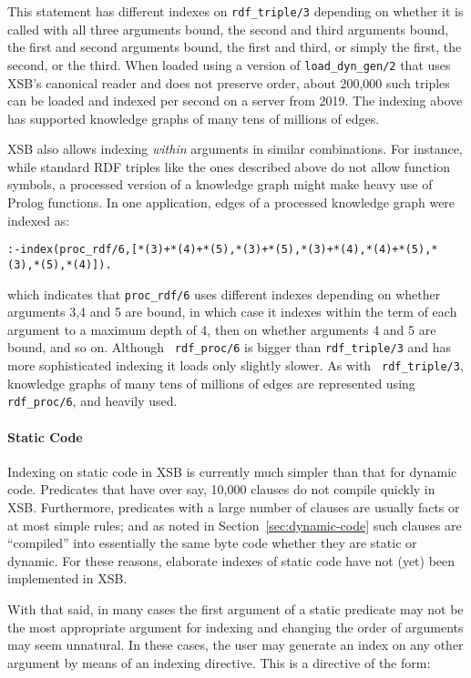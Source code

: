 
\noindent
This statement has different indexes on {\tt rdf\_triple/3} depending
on whether it is called with all three arguments bound, the second and
third arguments bound, the first and second arguments bound, the first
and third, or simply the first, the second, or the third.  When loaded
using a version of {\tt load\_dyn\_gen/2} that uses XSB's canonical
reader and does not preserve order, about 200,000 such triples can be
loaded and indexed per second on a server from 2019.  The indexing
above has supported knowledge graphs of many tens of millions of
edges.

XSB also allows indexing {\em within} arguments in similar
combinations.  For instance, while standard RDF triples like the ones
described above do not allow function symbols, a processed version of
a knowledge graph might make heavy use of Prolog functions.  In one
application, edges of a processed knowledge graph were indexed as:

\begin{verbatim}
:-index(proc_rdf/6,[*(3)+*(4)+*(5),*(3)+*(5),*(3)+*(4),*(4)+*(5),*(3),*(5),*(4)]).
\end{verbatim}
\noindent
which indicates that {\tt proc\_rdf/6} uses different indexes
depending on whether arguments 3,4 and 5 are bound, in which case it
indexes within the term of each argument to a maximum depth of 4, then
on whether arguments 4 and 5 are bound, and so on.  Although {\tt
  rdf\_proc/6} is bigger than {\tt rdf\_triple/3} and has more
sophisticated indexing it loads only slightly slower.  As with {\tt
  rdf\_triple/3}, knowledge graphs of many tens of millions of edges
are represented using {\tt rdf\_proc/6}, and heavily used.

\paragraph{Static Code}
Indexing on static code in XSB is currently much simpler than that for
dynamic code.  Predicates that have over say, 10,000 clauses do not
compile quickly in XSB.  Furthermore, predicates with a large number
of clauses are usually facts or at most simple rules; and as noted in
Section~\ref{sec:dynamic-code} such clauses are ``compiled'' into
essentially the same byte code whether they are static or dynamic.
For these reasons, elaborate indexes of static code have not (yet)
been implemented in XSB.

With that said, in many cases the first argument of a static predicate
may not be the most appropriate argument for indexing and changing the
order of arguments may seem unnatural.  In these cases, the user may
generate an index on any other argument by means of an indexing
directive.  This is a directive of the form:

